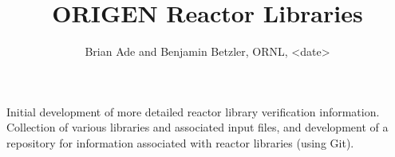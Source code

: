 \documentclass[12pt]{article}
\title{ORIGEN Reactor Libraries}
\author{Brian Ade and Benjamin Betzler, ORNL, <date>}
\date{}							%
\begin{document}
\raggedright
\maketitle

Initial development of more detailed reactor library verification information.   Collection of various libraries and associated input files, and development of a repository for information associated with reactor libraries (using Git). 

\clearpage
\tableofcontents


\end{document}
